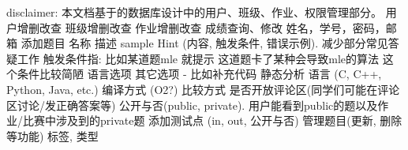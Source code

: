 \markdownRendererInterblockSeparator
{}disclaimer: 本文档基于的数据库设计中的用户、班级、作业、权限管理部分。\markdownRendererInterblockSeparator
{}\markdownRendererInterblockSeparator
{}\markdownRendererUlBeginTight
\markdownRendererUlItem 用户增删改查\markdownRendererUlItemEnd 
\markdownRendererUlItem 班级增删改查\markdownRendererUlItemEnd 
\markdownRendererUlItem 作业增删改查\markdownRendererUlItemEnd 
\markdownRendererUlItem 成绩查询、修改\markdownRendererUlItemEnd 
\markdownRendererUlEndTight \markdownRendererInterblockSeparator
{}\markdownRendererInterblockSeparator
{}\markdownRendererUlBeginTight
\markdownRendererUlItem 姓名，学号，密码，邮箱\markdownRendererUlItemEnd 
\markdownRendererUlEndTight \markdownRendererInterblockSeparator
{}\markdownRendererInterblockSeparator
{}\markdownRendererUlBeginTight
\markdownRendererUlItem 添加题目\markdownRendererUlItemEnd 
\markdownRendererUlItem 名称\markdownRendererUlItemEnd 
\markdownRendererUlItem 描述\markdownRendererUlItemEnd 
\markdownRendererUlItem sample\markdownRendererUlItemEnd 
\markdownRendererUlItem Hint (内容, 触发条件, 错误示例). 减少部分常见答疑工作\markdownRendererInterblockSeparator
{}\markdownRendererUlBeginTight
\markdownRendererUlItem 触发条件指: 比如某道题mle 就提示 这道题卡了某种会导致mle的算法\markdownRendererUlItemEnd 
\markdownRendererUlItem 这个条件比较简陋\markdownRendererUlItemEnd 
\markdownRendererUlEndTight \markdownRendererUlItemEnd 
\markdownRendererUlItem 语言选项\markdownRendererInterblockSeparator
{}\markdownRendererUlBeginTight
\markdownRendererUlItem 其它选项 - 比如补充代码\markdownRendererUlItemEnd 
\markdownRendererUlItem 静态分析\markdownRendererUlItemEnd 
\markdownRendererUlItem 语言 (C, C++, Python, Java, etc.)\markdownRendererUlItemEnd 
\markdownRendererUlItem 编译方式 (O2?)\markdownRendererUlItemEnd 
\markdownRendererUlItem 比较方式\markdownRendererUlItemEnd 
\markdownRendererUlEndTight \markdownRendererUlItemEnd 
\markdownRendererUlItem 是否开放评论区(同学们可能在评论区讨论/发正确答案等)\markdownRendererUlItemEnd 
\markdownRendererUlItem 公开与否(public, private). 用户能看到public的题以及作业/比赛中涉及到的private题\markdownRendererUlItemEnd 
\markdownRendererUlItem 添加测试点 (in, out, 公开与否)\markdownRendererUlItemEnd 
\markdownRendererUlItem 管理题目(更新, 删除等功能)\markdownRendererUlItemEnd 
\markdownRendererUlItem 标签, 类型\markdownRendererUlItemEnd 
